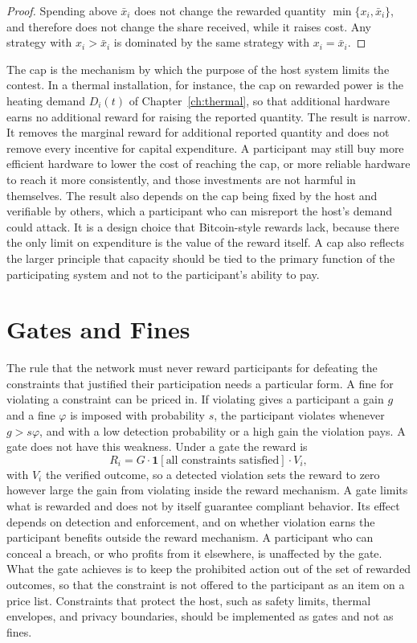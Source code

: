 \begin{proof}
Spending above $\bar x_i$ does not change the rewarded quantity $\min\{x_i,\bar x_i\}$, and therefore does not change the share received, while it raises cost. Any strategy with $x_i>\bar x_i$ is dominated by the same strategy with $x_i=\bar x_i$.
\end{proof}

The cap is the mechanism by which the purpose of the host system limits the contest. In a thermal installation, for instance, the cap on rewarded power is the heating demand $D_i(t)$ of Chapter~\ref{ch:thermal}, so that additional hardware earns no additional reward for raising the reported quantity. The result is narrow. It removes the marginal reward for additional reported quantity and does not remove every incentive for capital expenditure. A participant may still buy more efficient hardware to lower the cost of reaching the cap, or more reliable hardware to reach it more consistently, and those investments are not harmful in themselves. The result also depends on the cap being fixed by the host and verifiable by others, which a participant who can misreport the host's demand could attack. It is a design choice that Bitcoin-style rewards lack, because there the only limit on expenditure is the value of the reward itself. A cap also reflects the larger principle that capacity should be tied to the primary function of the participating system and not to the participant's ability to pay.

\section{Gates and Fines}

The rule that the network must never reward participants for defeating the constraints that justified their participation needs a particular form. A fine for violating a constraint can be priced in. If violating gives a participant a gain $g$ and a fine $\varphi$ is imposed with probability $s$, the participant violates whenever $g>s\varphi$, and with a low detection probability or a high gain the violation pays. A gate does not have this weakness. Under a gate the reward is
\[
R_i=G\cdot\mathbf 1[\text{all constraints satisfied}]\cdot V_i,
\]
with $V_i$ the verified outcome, so a detected violation sets the reward to zero however large the gain from violating inside the reward mechanism. A gate limits what is rewarded and does not by itself guarantee compliant behavior. Its effect depends on detection and enforcement, and on whether violation earns the participant benefits outside the reward mechanism. A participant who can conceal a breach, or who profits from it elsewhere, is unaffected by the gate. What the gate achieves is to keep the prohibited action out of the set of rewarded outcomes, so that the constraint is not offered to the participant as an item on a price list. Constraints that protect the host, such as safety limits, thermal envelopes, and privacy boundaries, should be implemented as gates and not as fines.

